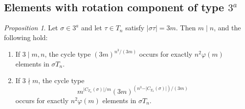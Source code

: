 \documentclass[12pt]{article}
\theoremstyle{definition}
\theoremstyle{remark}
\newtheorem{proposition}[theorem]{Proposition}
\begin{document}
\subsection{Elements with rotation component of type $3^a$}
\begin{proposition}\label{prop:cycle-3a}
Let $\sigma\in 3^a$ and let $\tau\in T_n$ satisfy $\vert\sigma\tau\vert=3m$.
Then $m\mid n$, and the following hold:
\begin{enumerate}
\item[(a)] If $3\mid  m,n$, the cycle type
$(3m)^{n^3/(3m)}$
occurs for exactly $n^2\varphi(m)$ elements in $\sigma T_n$.
\item[(b)] If $3\nmid m$, the cycle type
\[
m^{\vert C_{T_n}(\sigma)\vert/m}
(3m)^{(n^3-\vert C_{T_n}(\sigma)\vert)/(3m)}
\]
occurs for exactly $n^2\varphi(m)$ elements in $\sigma T_n$.
\end{enumerate}
\end{proposition}
\end{document}
